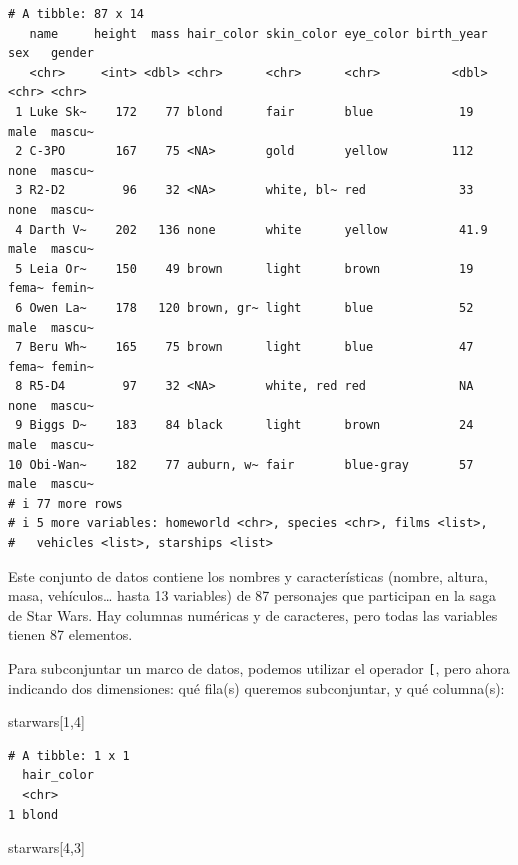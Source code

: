 \documentclass[
  letterpaper,
  DIV=11,
  numbers=noendperiod]{scrreprt}
\newenvironment{Shaded}{\begin{snugshade}}{\end{snugshade}}
\newcommand{\DecValTok}[1]{\textcolor[rgb]{0.68,0.00,0.00}{#1}}
\newcommand{\NormalTok}[1]{\textcolor[rgb]{0.00,0.23,0.31}{#1}}
\begin{document}
\begin{verbatim}
# A tibble: 87 x 14
   name     height  mass hair_color skin_color eye_color birth_year sex   gender
   <chr>     <int> <dbl> <chr>      <chr>      <chr>          <dbl> <chr> <chr> 
 1 Luke Sk~    172    77 blond      fair       blue            19   male  mascu~
 2 C-3PO       167    75 <NA>       gold       yellow         112   none  mascu~
 3 R2-D2        96    32 <NA>       white, bl~ red             33   none  mascu~
 4 Darth V~    202   136 none       white      yellow          41.9 male  mascu~
 5 Leia Or~    150    49 brown      light      brown           19   fema~ femin~
 6 Owen La~    178   120 brown, gr~ light      blue            52   male  mascu~
 7 Beru Wh~    165    75 brown      light      blue            47   fema~ femin~
 8 R5-D4        97    32 <NA>       white, red red             NA   none  mascu~
 9 Biggs D~    183    84 black      light      brown           24   male  mascu~
10 Obi-Wan~    182    77 auburn, w~ fair       blue-gray       57   male  mascu~
# i 77 more rows
# i 5 more variables: homeworld <chr>, species <chr>, films <list>,
#   vehicles <list>, starships <list>
\end{verbatim}

Este conjunto de datos contiene los nombres y características (nombre,
altura, masa, vehículos\ldots{} hasta 13 variables) de 87 personajes que
participan en la saga de Star Wars. Hay columnas numéricas y de
caracteres, pero todas las variables tienen 87 elementos.

Para subconjuntar un marco de datos, podemos utilizar el operador
\texttt{{[}}, pero ahora indicando dos dimensiones: qué fila(s) queremos
subconjuntar, y qué columna(s):

\begin{Shaded}
\begin{Highlighting}[]
\NormalTok{starwars[}\DecValTok{1}\NormalTok{,}\DecValTok{4}\NormalTok{]}
\end{Highlighting}
\end{Shaded}

\begin{verbatim}
# A tibble: 1 x 1
  hair_color
  <chr>     
1 blond     
\end{verbatim}

\begin{Shaded}
\begin{Highlighting}[]
\NormalTok{starwars[}\DecValTok{4}\NormalTok{,}\DecValTok{3}\NormalTok{]}
\end{Highlighting}
\end{Shaded}
\end{document}
